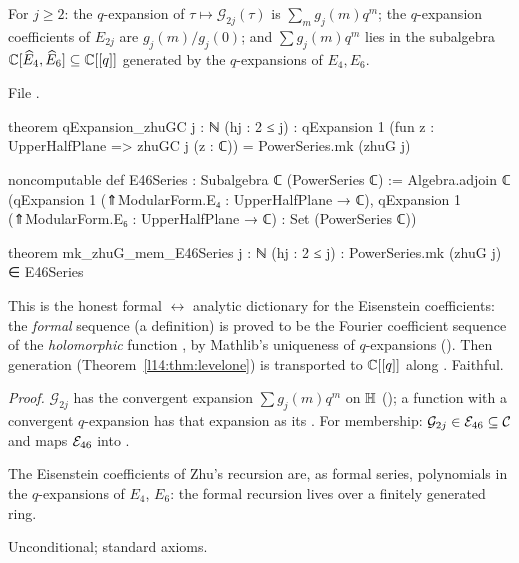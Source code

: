 \begin{theorem}\label{l14:thm:qexpzhuG}
For $j\ge2$: the $q$-expansion of $\tau\mapsto\mathcal G_{2j}(\tau)$ is $\sum_mg_j(m)q^m$; the $q$-expansion coefficients of
$E_{2j}$ are $g_j(m)/g_j(0)$; and $\sum g_j(m)q^m$ lies in the subalgebra ${\mathbb{C}}[\widehat{E}_4,\widehat{E}_6]\subseteq{\mathbb{C}}[[q]]$
generated by the $q$-expansions of $E_4,E_6$.
\end{theorem}
\noindent File .
\begin{leancode}
theorem qExpansion_zhuGC {j : ℕ} (hj : 2 ≤ j) :
    qExpansion 1 (fun z : UpperHalfPlane => zhuGC j (z : ℂ)) = PowerSeries.mk (zhuG j)

noncomputable def E46Series : Subalgebra ℂ (PowerSeries ℂ) :=
  Algebra.adjoin ℂ ({qExpansion 1 (⇑ModularForm.E₄ : UpperHalfPlane → ℂ),
    qExpansion 1 (⇑ModularForm.E₆ : UpperHalfPlane → ℂ)} : Set (PowerSeries ℂ))

theorem mk_zhuG_mem_E46Series {j : ℕ} (hj : 2 ≤ j) :
    PowerSeries.mk (zhuG j) ∈ E46Series
\end{leancode}
\begin{dictionary}
This is the honest formal $\leftrightarrow$ analytic dictionary for the Eisenstein coefficients: the \emph{formal} sequence
 (a definition) is proved to be the Fourier coefficient sequence of the \emph{holomorphic} function
, by Mathlib's uniqueness of $q$-expansions (). Then
generation (Theorem~\ref{l14:thm:levelone}) is transported to ${\mathbb{C}}[[q]]$ along . Faithful.
\end{dictionary}
\noindent\emph{Proof.} $\mathcal G_{2j}$ has the convergent expansion $\sum g_j(m)q^m$ on $\mathbb{H}$
(); a function with a convergent $q$-expansion has that expansion as its . For membership:
$\mathcal G_{2j}\in\mathcal{E}_{46}\subseteq\mathcal C$ and  maps $\mathcal{E}_{46}$ into .
\begin{physics}
The Eisenstein coefficients of Zhu's recursion are, as formal series, polynomials in the $q$-expansions of $E_4$, $E_6$:
the formal recursion lives over a finitely generated ring.
\end{physics}
\begin{status}
Unconditional; standard axioms.
\end{status}

